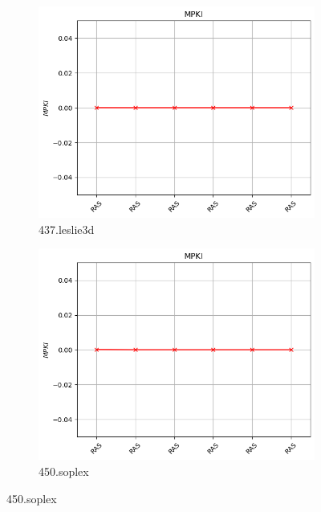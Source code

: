 \documentclass{article}
\begin{document}
\begin{figure}[H]
    \centering
    \ContinuedFloat

    \begin{subfigure}[b]{0.45\textwidth}
        \includegraphics[width=\textwidth]{figures/5_5/437.leslie3d.cslab_branch_preds_ref.out.png}
        \caption{437.leslie3d}
        \label{fig:plot73}
    \end{subfigure}
    \hfill
    \begin{subfigure}[b]{0.45\textwidth}
        \includegraphics[width=\textwidth]{figures/5_5/450.soplex.cslab_branch_preds_ref.out.png}
        \caption{450.soplex}
        \label{fig:plot74}
    \end{subfigure}


\end{figure}
\end{document}
